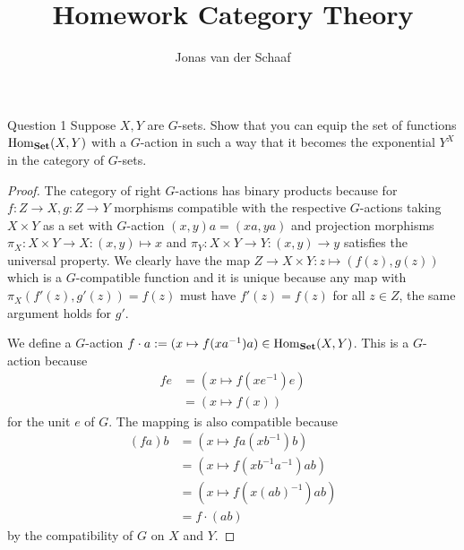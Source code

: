 \documentclass{article}
\title{Homework Category Theory}
\author{Jonas van der Schaaf}
\date{}
\DeclareMathOperator{\Hom}{Hom}
\newcommand{\catset}{{\bf Set}}
\newenvironment{question}[1][]{\begin{paragraph}{Question #1}}{\end{paragraph}}
\theoremstyle{definition}
\begin{document}
\maketitle
\begin{question}[1]
    Suppose \(X,Y\) are \(G\)-sets. Show that you can equip the set of functions
    \(\Hom_{\catset}(X,Y)\) with a \(G\)-action in such a way that it becomes
    the exponential \(Y^{X}\) in the category of \(G\)-sets.

    \begin{proof}
        The category of right \(G\)-actions has binary products because for
        \(f:Z\to X,g:Z\to Y\) morphisms compatible with the respective
        \(G\)-actions taking \(X\times Y\) as a set with \(G\)-action
        \((x,y)a=(xa,ya)\) and projection morphisms \(\pi_{X}:X\times Y\to
        X:(x,y)\mapsto x\) and \(\pi_{Y}:X\times Y\to Y:(x,y)\to y\) satisfies
        the universal property. We clearly have the map \(Z\to X\times
        Y:z\mapsto (f(z),g(z))\) which is a \(G\)-compatible function and it is
        unique because any map with \(\pi_{X}(f'(z),g'(z))=f(z)\) must have
        \(f'(z)=f(z)\) for all \(z\in Z\), the same argument holds for \(g'\).

        We define a \(G\)-action \(f\cdot a:=(x\mapsto
        f(xa^{-1})a)\in\Hom_{\catset}(X,Y)\). This is a \(G\)-action because
        \begin{align*}
            fe & =(x\mapsto f(xe^{-1})e) \\
               & =(x\mapsto f(x))
        \end{align*}
        for the unit \(e\) of \(G\). The mapping is also compatible because
        \begin{align*}
            (fa)b & =(x\mapsto fa(xb^{-1})b)       \\
                  & =(x\mapsto f(xb^{-1}a^{-1})ab) \\
                  & =(x\mapsto f(x(ab)^{-1})ab)    \\
                  & =f\cdot(ab)
        \end{align*}
        by the compatibility of \(G\) on \(X\) and \(Y\).


\end{proof}
\end{question}
\end{document}
